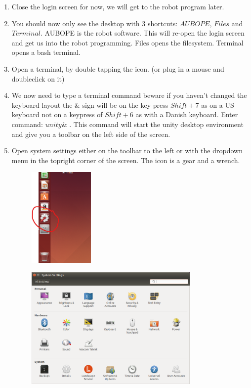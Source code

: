 \documentclass{article}
\begin{document}
\begin{enumerate}
\begin{figure}[H]
\end{figure}
\item Close the login screen for now, we will get to the robot program later. 
\item You should now only see the desktop with 3 shortcuts: $AUBOPE$, $Files$ and $Terminal$. AUBOPE is the robot software. This will re-open the login screen and get us into the robot programming. Files opens the filesystem. Terminal opens a bash terminal.
\item Open a terminal, by double tapping the icon. (or plug in a mouse and doubleclick on it)
\item  We now need to type a terminal command beware if you haven't changed the keyboard layout the $\&$ sign will be on the key press $Shift+7$ as on a US keyboard not on a keypress of $Shift+6$ as with a Danish keyboard. Enter command: $unity\&$ .
This command will start the unity desktop environment and give you a toolbar on the left side of the screen.
\item Open system settings either on the toolbar to the left or with the dropdown menu in the topright corner of the screen. The icon is a gear and a wrench. 
\begin{figure}[H]\centering
  \includegraphics[width=0.3\textwidth]{../../Images/systemSettingsButton.png}
\end{figure}
\begin{figure}[H]\centering
  \includegraphics[width=0.8\textwidth]{../../Images/systemSettings.png}

\end{figure}
\end{enumerate}
\end{document}
